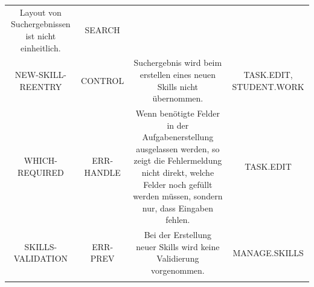 \documentclass[
  12pt,
  ngerman,
  a4paper,
]{article}
\begin{document}
\begin{longtable}[]{@{}cccc@{}}
\begin{minipage}[t]{0.33\columnwidth}
Layout von Suchergebnissen ist nicht einheitlich.\strut
\end{minipage} & \begin{minipage}[t]{0.32\columnwidth}\centering
SEARCH\strut
\end{minipage}\tabularnewline
\begin{minipage}[t]{0.11\columnwidth}\centering
NEW-SKILL-REENTRY\strut
\end{minipage} & \begin{minipage}[t]{0.13\columnwidth}\centering
CONTROL\strut
\end{minipage} & \begin{minipage}[t]{0.33\columnwidth}\centering
Suchergebnis wird beim erstellen eines neuen Skills nicht
übernommen.\strut
\end{minipage} & \begin{minipage}[t]{0.32\columnwidth}\centering
TASK.EDIT, STUDENT.WORK\strut
\end{minipage}\tabularnewline
\begin{minipage}[t]{0.11\columnwidth}\centering
WHICH-REQUIRED\strut
\end{minipage} & \begin{minipage}[t]{0.13\columnwidth}\centering
ERR-HANDLE\strut
\end{minipage} & \begin{minipage}[t]{0.33\columnwidth}\centering
Wenn benötigte Felder in der Aufgabenerstellung ausgelassen werden, so
zeigt die Fehlermeldung nicht direkt, welche Felder noch gefüllt werden
müssen, sondern nur, dass Eingaben fehlen.\strut
\end{minipage} & \begin{minipage}[t]{0.32\columnwidth}\centering
TASK.EDIT\strut
\end{minipage}\tabularnewline
\begin{minipage}[t]{0.11\columnwidth}\centering
SKILLS-VALIDATION\strut
\end{minipage} & \begin{minipage}[t]{0.13\columnwidth}\centering
ERR-PREV\strut
\end{minipage} & \begin{minipage}[t]{0.33\columnwidth}\centering
Bei der Erstellung neuer Skills wird keine Validierung
vorgenommen.\strut
\end{minipage} & \begin{minipage}[t]{0.32\columnwidth}\centering
MANAGE.SKILLS\strut
\end{minipage}\tabularnewline
\begin{minipage}[t]{0.11\columnwidth}\centering

\end{minipage}
\end{longtable}
\end{document}
